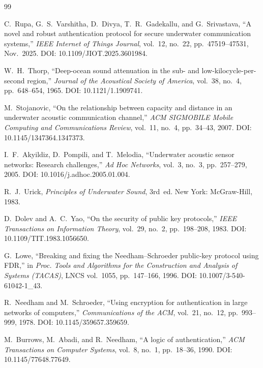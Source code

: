 \cleardoublepage
{}
\begin{thebibliography}{99}
\small
\setlength{\itemsep}{4pt}

C.~Rupa, G.~S.~Varshitha, D.~Divya, T.~R.~Gadekallu, and G.~Srivastava,
``A novel and robust authentication protocol for secure underwater communication systems,''
\emph{IEEE Internet of Things Journal}, vol.~12, no.~22, pp.~47519--47531, Nov.~2025.
DOI: 10.1109/JIOT.2025.3601984.

W.~H.~Thorp,
``Deep-ocean sound attenuation in the sub- and low-kilocycle-per-second region,''
\emph{Journal of the Acoustical Society of America}, vol.~38, no.~4, pp.~648--654, 1965.
DOI: 10.1121/1.1909741.

M.~Stojanovic,
``On the relationship between capacity and distance in an underwater acoustic communication
channel,''
\emph{ACM SIGMOBILE Mobile Computing and Communications Review}, vol.~11, no.~4,
pp.~34--43, 2007. DOI: 10.1145/1347364.1347373.

I.~F.~Akyildiz, D.~Pompili, and T.~Melodia,
``Underwater acoustic sensor networks: Research challenges,''
\emph{Ad Hoc Networks}, vol.~3, no.~3, pp.~257--279, 2005.
DOI: 10.1016/j.adhoc.2005.01.004.

R.~J.~Urick,
\emph{Principles of Underwater Sound}, 3rd~ed.
New York: McGraw-Hill, 1983.

D.~Dolev and A.~C.~Yao,
``On the security of public key protocols,''
\emph{IEEE Transactions on Information Theory}, vol.~29, no.~2, pp.~198--208, 1983.
DOI: 10.1109/TIT.1983.1056650.

G.~Lowe,
``Breaking and fixing the Needham--Schroeder public-key protocol using FDR,''
in \emph{Proc. Tools and Algorithms for the Construction and Analysis of Systems (TACAS)},
LNCS vol.~1055, pp.~147--166, 1996. DOI: 10.1007/3-540-61042-1\_43.

R.~Needham and M.~Schroeder,
``Using encryption for authentication in large networks of computers,''
\emph{Communications of the ACM}, vol.~21, no.~12, pp.~993--999, 1978.
DOI: 10.1145/359657.359659.

M.~Burrows, M.~Abadi, and R.~Needham,
``A logic of authentication,''
\emph{ACM Transactions on Computer Systems}, vol.~8, no.~1, pp.~18--36, 1990.
DOI: 10.1145/77648.77649.


\end{thebibliography}
